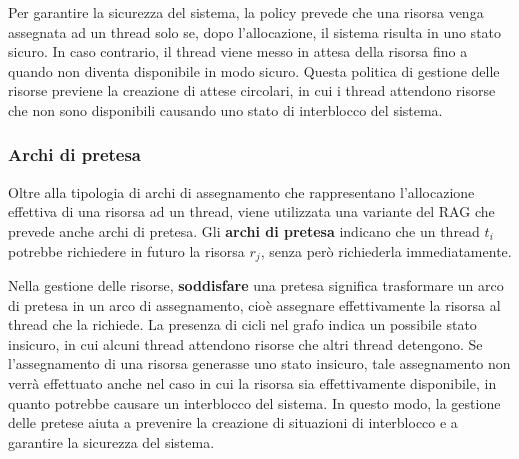 \documentclass{article}
\begin{document}
Per garantire la sicurezza del sistema, la policy prevede che una risorsa venga assegnata ad un thread solo se, dopo l'allocazione, il sistema risulta in uno stato sicuro. In caso contrario, il thread viene messo in attesa della risorsa fino a quando non diventa disponibile in modo sicuro. Questa politica di gestione delle risorse previene la creazione di attese circolari, in cui i thread attendono risorse che non sono disponibili causando uno stato di interblocco del sistema.
\subsubsection{Archi di pretesa}
Oltre alla tipologia di archi di assegnamento che rappresentano l'allocazione effettiva di una risorsa ad un thread, viene utilizzata una variante del RAG che prevede anche archi di pretesa. Gli \textbf{archi di pretesa} indicano che un thread $t_i$ potrebbe richiedere in futuro la risorsa $r_{j}$, senza però richiederla immediatamente.

Nella gestione delle risorse, \textbf{soddisfare} una pretesa significa trasformare un arco di pretesa in un arco di assegnamento, cioè assegnare effettivamente la risorsa al thread che la richiede. La presenza di cicli nel grafo indica un possibile stato insicuro, in cui alcuni thread attendono risorse che altri thread detengono. Se l'assegnamento di una risorsa generasse uno stato insicuro, tale assegnamento non verrà effettuato anche nel caso in cui la risorsa sia effettivamente disponibile, in quanto potrebbe causare un interblocco del sistema. In questo modo, la gestione delle pretese aiuta a prevenire la creazione di situazioni di interblocco e a garantire la sicurezza del sistema.
\end{document}
